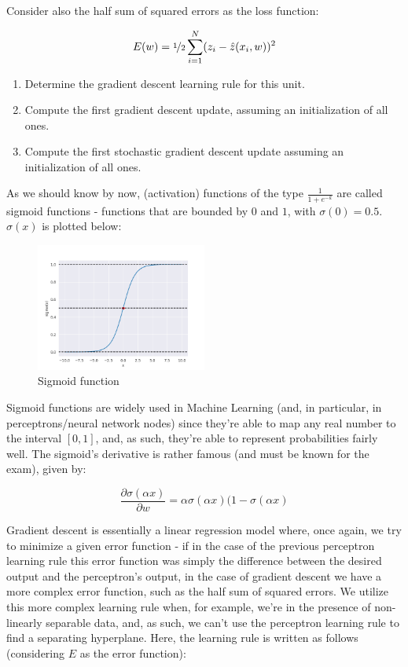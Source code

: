 \documentclass[12pt]{article}
\begin{document}
\begin{enumerate}[leftmargin=\labelsep]
\begin{tcolorbox}[enhanced jigsaw,colback=bg,boxrule=0pt,arc=1pt,halign=center]
    Consider also the half sum of squared errors as the loss function:

    \begin{equation*}
      E(w) = \nicefrac{1}{2} \sum_{i=1}^N (z_i - \hat{z}(x_i, w))^2
    \end{equation*}

    \begin{enumerate}
      \item Determine the gradient descent learning rule for this unit.
      \item Compute the first gradient descent update, assuming an initialization of all ones.
      \item Compute the first stochastic gradient descent update assuming an initialization of all ones.
    \end{enumerate}
  \end{tcolorbox}

  As we should know by now, (activation) functions of the type $\frac{1}{1 + e^{-k}}$
  are called sigmoid functions - functions that are bounded by $0$ and $1$,
  with $\sigma(0) = 0.5$. $\sigma(x)$ is plotted below:

  \begin{figure}[h]
    \centering
    \includegraphics[width=0.5\textwidth]{assets/sigmoid.png}
    \caption{Sigmoid function}
  \end{figure}

  Sigmoid functions are widely used in Machine Learning (and, in particular, in
  perceptrons/neural network nodes) since they're able to map any real number
  to the interval $[0, 1]$, and, as such, they're able to represent probabilities
  fairly well. The sigmoid's derivative is rather famous (and must be known
  for the exam), given by:

  $$
    \frac{\partial \sigma(\alpha x)}{\partial w} = \alpha \sigma(\alpha x) (1 - \sigma(\alpha x)
  $$

  Gradient descent is essentially a linear regression
  model where, once again, we try to minimize a given error function - if in the case
  of the previous perceptron learning rule this error function was simply the
  difference between the desired output and the perceptron's output, in the case
  of gradient descent we have a more complex error function, such as the half
  sum of squared errors. We utilize this more complex learning rule when, for example,
  we're in the presence of non-linearly separable data, and, as such, we can't
  use the perceptron learning rule to find a separating hyperplane. Here, the
  learning rule is written as follows (considering $E$ as the error function):


\end{enumerate}
\end{document}
